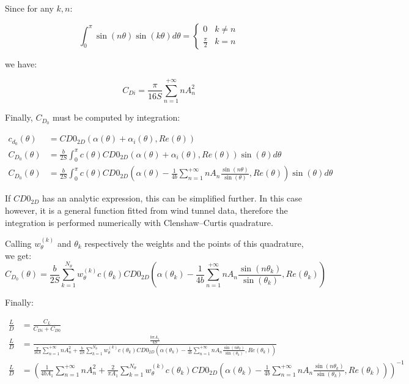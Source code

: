 \documentclass[letterpaper,12pt]{article}
\begin{document}
Since for any $k, n$:

\begin{equation*}
	\int_0^{\pi} \sin(n\theta)\sin(k\theta)d\theta = 
	\begin{cases} 
		0 & k \neq n \\
		\frac{\pi}{2} & k = n
	 \end{cases}
\end{equation*}

we have:

\begin{equation}
	C_{Di} = \frac {\pi}{16S} \sum_{n=1}^{+\infty} n A_{n}^2
\end{equation}

Finally, $C_{D_0}$ must be computed by integration:

\begin{align*}
	c_{d_0}(\theta) &= CD0_{2D}\left( \alpha(\theta) + \alpha_i(\theta), Re(\theta)\right) \\
	C_{D_0}(\theta) &= \frac b {2S} \int_{0}^{\pi} c(\theta) CD0_{2D}\left( \alpha(\theta) + \alpha_i(\theta), Re(\theta)\right) \sin(\theta) d\theta \\
	C_{D_0}(\theta) &= \frac b {2S} \int_{0}^{\pi} c(\theta) CD0_{2D}\left( \alpha(\theta) - \frac {1}{4b}  \sum_{n=1}^{+\infty} n A_n \frac{ \sin(n\theta) }{\sin(\theta)} , Re(\theta)\right) \sin(\theta) d\theta
\end{align*}

If $CD0_{2D}$ has an analytic expression, this can be simplified further.
In this case however, it is a general function fitted from wind tunnel data, 
therefore the integration is performed numerically with Clenshaw–Curtis quadrature. 

Calling $w_{\theta}^{(k)}$ and $\theta_k$ respectively the weights and the points of this quadrature, we get:
\begin{equation}
	C_{D_0}(\theta) = \frac b {2S} \sum_{k=1}^{N_{\theta}} w_{\theta}^{(k)} c(\theta_k) CD0_{2D}\left( \alpha(\theta_k) - \frac {1}{4b} \sum_{n=1}^{+\infty} n A_n \frac{ \sin(n\theta_k) }{\sin(\theta_k)} , Re(\theta_k)\right)
\end{equation}

Finally:

\begin{align}
	\frac L D &= \frac {C_L} 
	{C_{Di} + C_{D0}} \nonumber \\
	\frac L D &= \frac{\frac{b \pi A_1}{4S}}{
		\frac {\pi}{16S} \sum_{n=1}^{+\infty} n A_{n}^2 + 
		\frac b {2S} \sum_{k=1}^{N_{\theta}} w_{\theta}^{(k)} c(\theta_k) CD0_{2D}\left( \alpha(\theta_k) - \frac {1}{4b} \sum_{n=1}^{+\infty} n A_n \frac{ \sin(n\theta_k) }{\sin(\theta_k)} , Re(\theta_k)\right)
	} \nonumber \\
	\frac L D &= \left(	\frac {1}{4bA_1} \sum_{n=1}^{+\infty} n A_{n}^2 + 
		\frac {2} {\pi A_1} \sum_{k=1}^{N_{\theta}} w_{\theta}^{(k)} c(\theta_k) CD0_{2D}\left( \alpha(\theta_k) - \frac {1}{4b} \sum_{n=1}^{+\infty} n A_n \frac{ \sin(n\theta_k) }{\sin(\theta_k)} , Re(\theta_k)\right) 
	\right)^{-1} 
\end{align}
\end{document}
